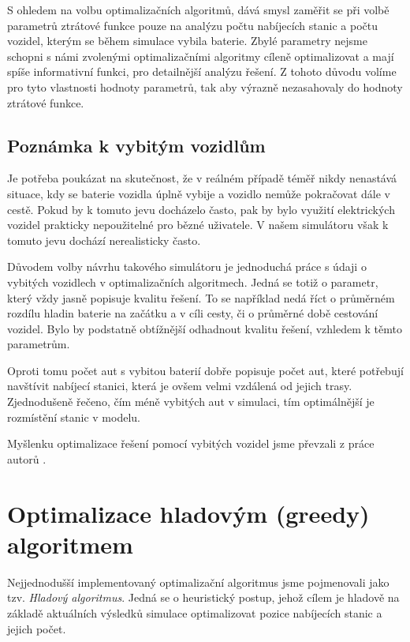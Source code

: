 S ohledem na volbu optimalizačních algoritmů, dává smysl zaměřit se při volbě
parametrů ztrátové funkce pouze na analýzu počtu nabíjecích stanic a počtu 
vozidel, kterým se během simulace vybila baterie.
Zbylé parametry nejsme schopni s námi zvolenými optimalizačními algoritmy 
cíleně optimalizovat a mají spíše informativní funkci, pro detailnější analýzu
řešení. Z tohoto důvodu volíme pro tyto vlastnosti hodnoty parametrů,
tak aby výrazně nezasahovaly do hodnoty ztrátové funkce.

\subsection{Poznámka k vybitým vozidlům}

Je potřeba poukázat na skutečnost, že v reálném případě téměř nikdy nenastává situace,
kdy se baterie vozidla úplně vybije a vozidlo nemůže pokračovat dále v cestě.
Pokud by k tomuto jevu docházelo často, pak by bylo využití elektrických vozidel
prakticky nepoužitelné pro bězné uživatele. V našem simulátoru však k tomuto jevu
dochází nerealisticky často.

Důvodem volby návrhu takového simulátoru je jednoduchá práce s údaji o
vybitých vozidlech v optimalizačních algoritmech.
Jedná se totiž o parametr, který vždy jasně popisuje kvalitu řešení. To se 
například nedá říct o průměrném rozdílu hladin baterie na začátku a v cíli cesty, či
o průměrné době cestování vozidel.
Bylo by podstatně obtížnější odhadnout kvalitu řešení, vzhledem k těmto parametrům.

Oproti tomu počet aut s vybitou baterií dobře popisuje počet aut, které
potřebují navštívit nabíjecí stanici, která je ovšem velmi vzdálená od jejich 
trasy. Zjednodušeně řečeno, čím méně vybitých aut v simulaci, tím optimálnější je 
rozmístění stanic v modelu.

Myšlenku optimalizace řešení pomocí vybitých vozidel jsme převzali z práce autorů
\citet{kmeans_layout}.


\section{Optimalizace hladovým (greedy) algoritmem}
\label{sec:greedy}

Nejjednodušší implementovaný optimalizační algoritmus jsme pojmenovali jako tzv. 
\emph{Hladový algoritmus}.
Jedná se o heuristický postup, jehož cílem je hladově na základě 
aktuálních výsledků simulace optimalizovat pozice nabíjecích stanic a jejich počet.

